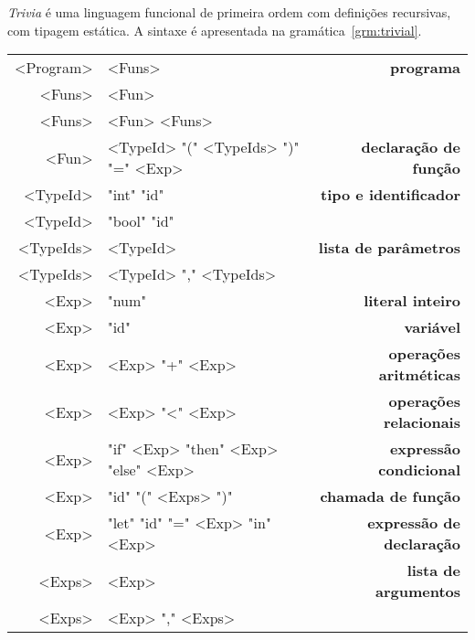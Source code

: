 \documentclass[a4paper,11pt,brazil]{article}
\newcommand{\lang}{\textsl{Trivia}}
\begin{document}
\lang{} é uma linguagem funcional de primeira ordem com definições
recursivas, com tipagem estática. A sintaxe é apresentada na
gramática~\ref{grm:trivial}.

\begin{gramatica}
  \begin{synshorts}
    \begin{mdframed}
    \begin{tabular}{r@{$\;\rightarrow\;$}l>{\bfseries}r}
      <Program> & <Funs>                               & programa                \\[.9em]
      <Funs>    & <Fun>                                &                         \\
      <Funs>    & <Fun> <Funs>                         &                         \\[.9em]
      <Fun>     & <TypeId> "(" <TypeIds> ")" "=" <Exp> & declaração de função    \\[.9em]
      <TypeId>  & "int" "id"                           & tipo e identificador    \\
      <TypeId>  & "bool" "id"                          &                         \\[.9em]
      <TypeIds> & <TypeId>                             & lista de parâmetros     \\
      <TypeIds> & <TypeId> "," <TypeIds>               &                         \\[.9em]
      <Exp>     & "num"                                & literal inteiro         \\
      <Exp>     & "id"                                 & variável                \\
      <Exp>     & <Exp> "+" <Exp>                      & operações aritméticas   \\
      <Exp>     & <Exp> "<" <Exp>                      & operações relacionais   \\
      <Exp>     & "if" <Exp> "then" <Exp> "else" <Exp> & expressão condicional   \\
      <Exp>     & "id" "(" <Exps> ")"                  & chamada de função       \\
      <Exp>     & "let" "id" "=" <Exp> "in" <Exp>      & expressão de declaração \\[.9em]
      <Exps>    & <Exp>                                & lista de argumentos     \\
      <Exps>    & <Exp> "," <Exps>                     &                         \\
    \end{tabular}
    \end{mdframed}
  \end{synshorts}
  \caption{Linguagem \lang{}}
  \label{grm:trivial}
\end{gramatica}
\end{document}
